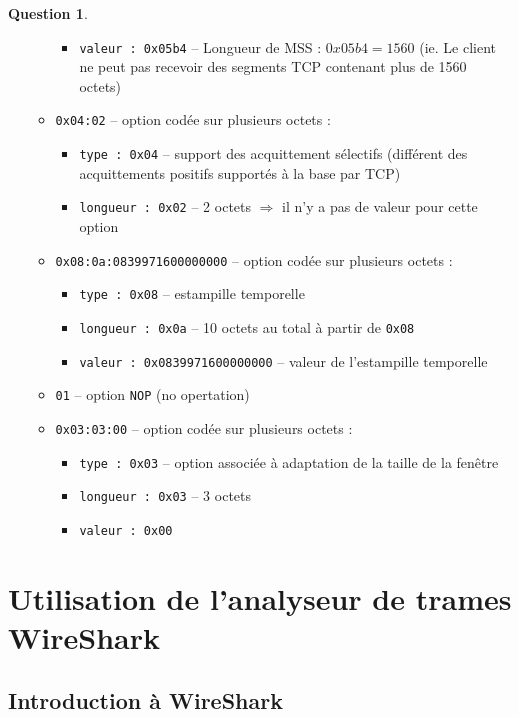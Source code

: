 \documentclass[11pt,english,french]{scrreprt}
\theoremstyle{remark}
\theoremstyle{definition}
\newtheorem{ques}{Question}[section]
\begin{document}
\begin{ques}
\begin{itemize}
\begin{itemize}
\begin{itemize}
				\item \lstinline!valeur : 0x05b4! -- Longueur de MSS : $0x05b4 = 1560$ (ie. Le client ne peut pas recevoir des segments TCP contenant plus de 1560 octets)
			\end{itemize}
			\item \lstinline!0x04:02! -- option codée sur plusieurs octets :\begin{itemize}
				\item \lstinline!type : 0x04! -- support des acquittement sélectifs (différent des acquittements positifs supportés à la base par TCP)
				\item \lstinline!longueur : 0x02! -- 2 octets $\Rightarrow$ il n'y a pas de valeur pour cette option
			\end{itemize}
			\item \lstinline!0x08:0a:0839971600000000! -- option codée sur plusieurs octets :\begin{itemize}
				\item \lstinline!type : 0x08! -- estampille temporelle
				\item \lstinline!longueur : 0x0a! -- 10 octets au total à partir de \lstinline!0x08!
				\item \lstinline!valeur : 0x0839971600000000! -- valeur de l'estampille temporelle
			\end{itemize}
			\item \lstinline!01! -- option \lstinline!NOP! (no opertation)
			\item \lstinline!0x03:03:00! -- option codée sur plusieurs octets :\begin{itemize}
				\item \lstinline!type : 0x03! -- option associée à adaptation de la taille de la fenêtre
				\item \lstinline!longueur : 0x03! -- 3 octets
				\item \lstinline!valeur : 0x00!
			\end{itemize}
		\end{itemize}
	\end{itemize}
\end{ques}

\section{Utilisation de l'analyseur de trames WireShark} %
\subsection{Introduction à WireShark} %
\end{document}
